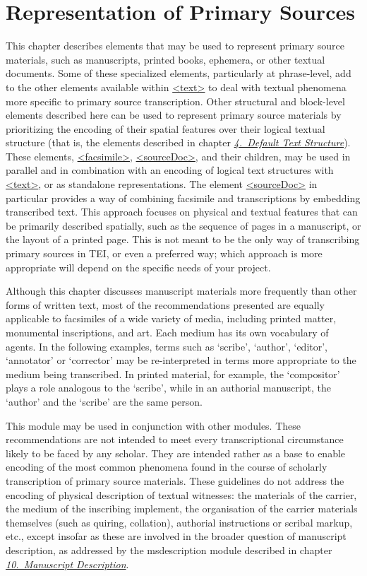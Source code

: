 
\section[{Representation of Primary Sources}]{Representation of Primary Sources}\label{PH}\par
This chapter describes elements that may be used to represent primary source materials, such as manuscripts, printed books, ephemera, or other textual documents. Some of these specialized elements, particularly at phrase-level, add to the other elements available within \hyperref[TEI.text]{<text>} to deal with textual phenomena more specific to primary source transcription. Other structural and block-level elements described here can be used to represent primary source materials by prioritizing the encoding of their spatial features over their logical textual structure (that is, the elements described in chapter \textit{\hyperref[DS]{4.\ Default Text Structure}}). These elements, \hyperref[TEI.facsimile]{<facsimile>}, \hyperref[TEI.sourceDoc]{<sourceDoc>}, and their children, may be used in parallel and in combination with an encoding of logical text structures with \hyperref[TEI.text]{<text>}, or as standalone representations. The element \hyperref[TEI.sourceDoc]{<sourceDoc>} in particular provides a way of combining facsimile and transcriptions by embedding transcribed text. This approach focuses on physical and textual features that can be primarily described spatially, such as the sequence of pages in a manuscript, or the layout of a printed page. This is not meant to be the only way of transcribing primary sources in TEI, or even a preferred way; which approach is more appropriate will depend on the specific needs of your project.\par
Although this chapter discusses manuscript materials more frequently than other forms of written text, most of the recommendations presented are equally applicable to facsimiles of a wide variety of media, including printed matter, monumental inscriptions, and art. Each medium has its own vocabulary of agents. In the following examples, terms such as ‘scribe’, ‘author’, ‘editor’, ‘annotator’ or ‘corrector’ may be re-interpreted in terms more appropriate to the medium being transcribed. In printed material, for example, the ‘compositor’ plays a role analogous to the ‘scribe’, while in an authorial manuscript, the ‘author’ and the ‘scribe’ are the same person.\par
This module may be used in conjunction with other modules. These recommendations are not intended to meet every transcriptional circumstance likely to be faced by any scholar. They are intended rather as a base to enable encoding of the most common phenomena found in the course of scholarly transcription of primary source materials. These guidelines do not address the encoding of physical description of textual witnesses: the materials of the carrier, the medium of the inscribing implement, the organisation of the carrier materials themselves (such as quiring, collation), authorial instructions or scribal markup, etc., except insofar as these are involved in the broader question of manuscript description, as addressed by the \textsf{msdescription} module described in chapter \textit{\hyperref[MS]{10.\ Manuscript Description}}.\par
